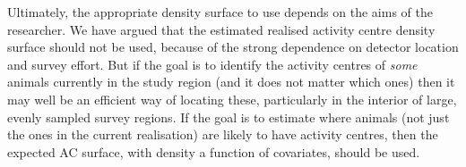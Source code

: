 \documentclass[useAMS,usenatbib,referee]{biom}
\begin{document}

Ultimately, the appropriate density surface to use depends on the aims of the researcher. We have argued that the estimated realised activity centre density surface should not be used, because of the strong dependence on detector location and survey effort. But if the goal is to identify the activity centres of {\it some} animals currently in the study region (and it does not matter which ones) then it may well be an efficient way of locating these, particularly in the interior of large, evenly sampled survey regions. If the goal is to estimate where animals (not just the ones in the current realisation) are likely to have activity centres, then the expected AC surface, with density a function of covariates, should be used.

\end{document}
